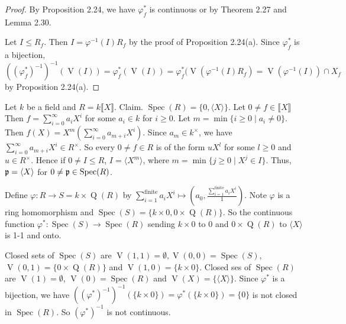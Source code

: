 \begin{proof}
    By Proposition 2.24, we have $\varphi_f^*$ is continuous or by Theorem 2.27 and Lemma 2.30. \par 
    Let $I \leq R_f$. Then $I = \varphi^{-1}(I)R_f$ by the proof of Proposition 2.24(a). Since $\varphi_f^*$ is a bijection, $((\varphi_f^*)^{-1})^{-1}(\operatorname{V}(I)) = \varphi_f^*(\operatorname{V}(I)) = \varphi_f^*(\operatorname{V}(\varphi^{-1}(I)R_f) = \operatorname{V}(\varphi^{-1}(I)) \cap X_f$ by Proposition 2.24(a). 
\end{proof}

\begin{example*}
    Let $k$ be a field and $R = k\llbracket X \rrbracket$. Claim. $\operatorname{Spec}(R) = \{0,\langle X \rangle\}$. Let $0 \neq f \in \llbracket X \rrbracket$ Then $f = \sum_{i=0}^\infty a_iX^i$ for some $a_i \in k$ for $i \geq 0$. Let $m = \min \{i \geq 0 \mid a_i \neq 0\}$. Then $f(X) = X^m(\sum_{i=0}^{\infty}a_{m+i}X^{i})$. Since $a_m \in k^\times$, we have $\sum_{i=0}^{\infty}a_{m+i}X^{i} \in R^\times$. So every $0 \neq f \in R$ is of the form $uX^l$ for some $l \geq 0$ and $u \in R^\times$. Hence if $0 \neq I \leq R$, $I = \langle X^m \rangle$, where $m = \min\{j \geq 0 \mid X^j \in I\}$. Thus, $\mathfrak{p} = \langle X \rangle$ for $0 \neq \mathfrak{p} \in \operatorname{Spec}(R)$. \par 
    Define $\varphi: R \to S = k \times \operatorname{Q}(R)$ by $\sum_{i=1}^{\text{finite}} a_iX^i \mapsto (a_0,\frac{\sum_{i=1}^{\text{finite}} a_iX^i}{1})$. Note $\varphi$ is a ring homomorphism and $\operatorname{Spec}(S) = \{k \times 0, 0 \times \operatorname{Q}(R)\}$. So the continuous function $\varphi^*: \operatorname{Spec}(S) \to \operatorname{Spec}(R)$ sending $k \times 0$ to $0$ and $0 \times \operatorname{Q}(R)$ to $\langle X \rangle$ is 1-1 and onto. \par 
    Closed sets of $\operatorname{Spec}(S)$ are $\operatorname{V}(1,1) = \emptyset, \operatorname{V}(0,0) = \operatorname{Spec}(S)$, $\operatorname{V}(0,1) = \{0 \times \operatorname{Q}(R)\}$ and $\operatorname{V}(1,0) = \{k \times 0\}$. Closed ses of $\operatorname{Spec}(R)$ are $\operatorname{V}(1) = \emptyset$, $\operatorname{V}(0) = \operatorname{Spec}(R)$ and $\operatorname{V}(X) = \{\langle X \rangle\}$. Since $\varphi^*$ is a bijection, we have $((\varphi^*)^{-1})^{-1}(\{k \times 0\}) = \varphi^*(\{k \times 0\}) = \{0\}$ is not closed in $\operatorname{Spec}(R)$. So $(\varphi^*)^{-1}$ is not continuous. 
\end{example*}

